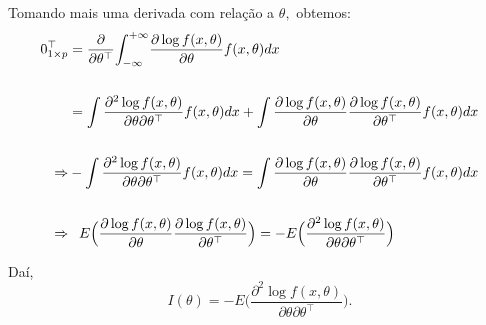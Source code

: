 \documentclass[12pt]{beamer}
\begin{document}
\begin{frame}{}
\begin{block}{}
\justifying
Tomando mais uma derivada com relação a $\theta,$ obtemos:
{\small
\begin{align*}
    0_{1\times p}^{\top}&=\dfrac{\partial}{\partial\theta^{\top}}{\displaystyle \int_{-\infty}^{+\infty}}\dfrac{\partial \log{f(x,\theta)}}{\partial\theta}f(x,\theta)dx\\
    \\
    &=\int \dfrac{\partial^{2}\log{f(x,\theta)}}{\partial\theta\partial\theta^{\top}}f(x,\theta)dx+\int \dfrac{\partial \log{f(x,\theta)}}{\partial\theta}\dfrac{\partial \log{f(x,\theta)}}{\partial\theta^{\top}}f(x,\theta)dx\\
    \\
    \Rightarrow &- \int \dfrac{\partial^{2}\log{f(x,\theta)}}{\partial\theta\partial\theta^{\top}}f(x,\theta)dx=\int \dfrac{\partial \log{f(x,\theta)}}{\partial\theta}\dfrac{\partial \log{f(x,\theta)}}{\partial\theta^{\top}}f(x,\theta)dx\\
    \\
    \Rightarrow &\phantom{=} E\Big(\dfrac{\partial \log{f(x,\theta)}}{\partial\theta}\dfrac{\partial \log{f(x,\theta)}}{\partial\theta^{\top}} \Big)   =-E\Big(\dfrac{\partial^{2}\log{f(x,\theta)}}{\partial\theta\partial\theta^{\top}}\Big)
\end{align*}
}
\end{block}
\end{frame}

\begin{frame}{}
\begin{block}{}
\justifying
Daí, $$I(\theta)=-E\Big(\dfrac{\partial^{2}\log{f(x,\theta)}}{\partial\theta\partial\theta^{\top}}\Big).$$
\end{block}
\end{frame}
\end{document}
